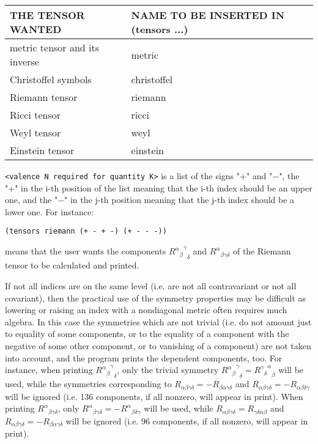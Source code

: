 \bigskip

\begin{tabular}{|l|l|}
  \hline
  THE TENSOR WANTED &  NAME TO BE INSERTED IN (tensors ...) \\ \hline \hline
   metric tensor and its inverse & metric \\ \hline
  Christoffel symbols & christoffel  \\ \hline
   Riemann tensor & riemann  \\ \hline
  Ricci tensor &  ricci   \\ \hline
   Weyl tensor  & weyl  \\ \hline
  Einstein tensor  & einstein  \\ \hline
\end{tabular}

\bigskip

\verb+<valence N required for quantity K>+ is a list of  the  signs
         "+"  and  "$-$",  the "+" in the i-th position of the list
         meaning that the i-th index should be an upper one,  and
         the "$-$" in the j-th position meaning that the j-th index
         should be a lower one. For instance:

\bigskip

\begin{verbatim}
(tensors riemann (+ - + -) (+ - - -))
\end{verbatim}

\bigskip

\noindent means that the user wants the components
${{{R^{\alpha}}_{\beta}}^{\gamma}}_{\delta}$ and ${R^{\alpha}}_{\beta \gamma
\delta}$ of the Riemann tensor to be calculated and printed.

If not all indices are on the same level (i.e. are  not
     all  contravariant or not all covariant), then the practical
     use of the symmetry properties may be difficult as  lowering
or raising an index with a nondiagonal metric often requires much algebra. In
this case the symmetries which are not trivial  (i.e.  do  not  amount just to
equality of some components, or to the equality of a component with  the
negative
     of some other component, or to vanishing of a component) are
not taken into account, and the program prints the dependent components, too.
For instance, when printing ${{{R^{\alpha}}_{\beta}}^{\gamma}}_{\delta}$, only
the trivial symmetry ${{{R^{\alpha}}_{\beta}}^{\gamma}}_{\delta} =
{{{R^{\gamma}}_{\delta}}^{\alpha}}_{\beta}$ will be used, while the symmetries
corresponding to $R_{\alpha \beta \gamma \delta} = - R_{\beta \alpha \gamma
\delta}$ and $R_{\alpha \beta \gamma \delta} = - R_{\alpha \beta \delta
\gamma}$ will be ignored (i.e. 136 components, if all  nonzero,  will appear in
print). When printing ${R^{\alpha}}_{\beta \gamma \delta}$, only
${R^{\alpha}}_{\beta \gamma \delta} = - {R^{\alpha}}_{\beta \delta \gamma}$
will be used, while $R_{\alpha \beta \gamma \delta} =  R_{\gamma \delta \alpha
\beta}$ and $R_{\alpha \beta \gamma \delta} = - R_{\beta \alpha \gamma \delta}$
will be ignored (i.e. 96 components, if all nonzero, will  appear
     in print).

